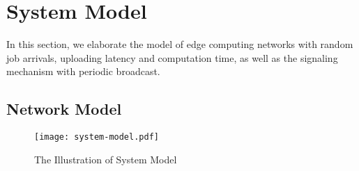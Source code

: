 \section{System Model}
\label{sec:model}
In this section, we elaborate the model of edge computing networks with random job arrivals, uploading latency and computation time,
{as well as the signaling mechanism with periodic broadcast.}
\subsection{Network Model}
\begin{figure*}[htp!]
    \centering
    \texttt{[image: system-model.pdf]}
    \caption{The Illustration of System Model}
    \label{fig:system}
\end{figure*}

